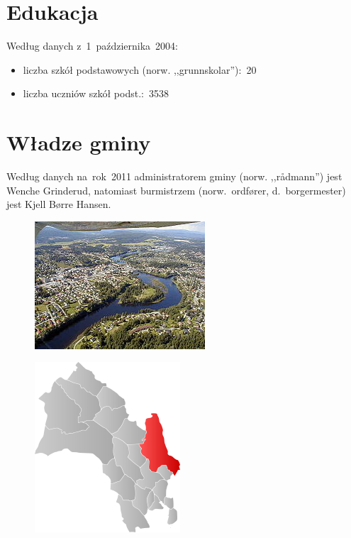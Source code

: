 \documentclass[a4paper,12pt]{article}
\begin{document}
\section{Edukacja}
Według danych z~1~października~2004:
\begin{itemize}
\item liczba szkół podstawowych (norw. ,,grunnskolar''):~20
\item liczba uczniów szkół podst.:~3538
\end{itemize}

\section{Władze gminy}
Według danych na~rok~2011 administratorem gminy (norw. ,,rådmann'') jest Wenche Grinderud, natomiast burmistrzem (norw.~ordfører, d.~borgermester) jest Kjell Børre Hansen.
\begin{figure}[p]
\caption{}
\label{zdj1}
\centering
\includegraphics{Ringerike.jpg}
\end{figure}

\begin{figure}[p]
\caption{}
\label{zdj2}
\centering
\includegraphics{Mapka.png}
\end{figure}
\end{document}
